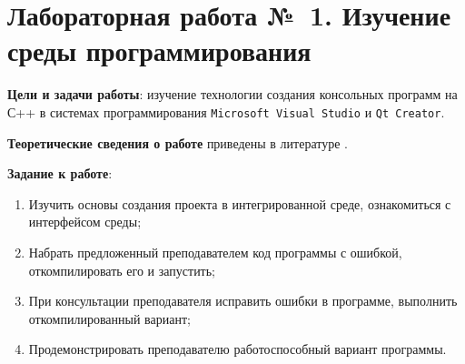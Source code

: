 \documentclass[main.tex]{subfiles}
\begin{document}
\chapter[Л/р~1 Изучение среды программирования]{Лабораторная работа №~1. Изучение среды программирования}

\textbf{Цели и задачи работы}: изучение технологии создания консольных программ на С++ в системах программирования \texttt{Microsoft Visual Studio} и \texttt{Qt Creator}.

\textbf{Теоретические сведения о работе} приведены в литературе \cite{vs2010,qt2019}.

\textbf{Задание к работе}:
\begin{enumerate}
    \item Изучить основы создания проекта в интегрированной среде, ознакомиться с интерфейсом среды;
    \item Набрать предложенный преподавателем код программы с ошибкой, откомпилировать его и запустить;
    \item При консультации преподавателя исправить ошибки в программе, выполнить откомпилированный вариант;
    \item Продемонстрировать преподавателю работоспособный вариант программы.
\end{enumerate}
\end{document}
